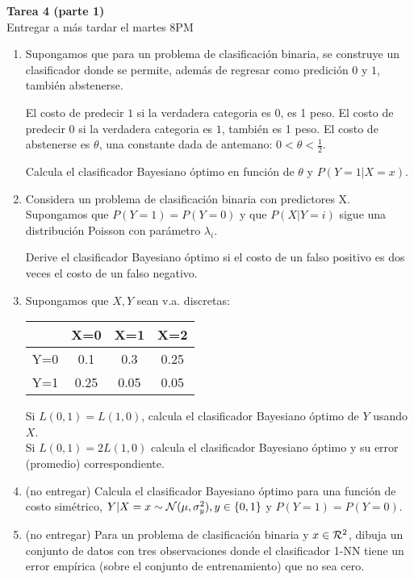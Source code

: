 \documentclass[12pt]{book}
\newcommand {\?}{?`}
\begin{document}
\specialaccent \mbox{} 
\begin{center}
{\Large \bf Tarea 4 (parte 1)} \mbox{} \vspace{0.5cm} \\
Entregar a m\'as tardar el martes 8PM
\end{center}


\begin{enumerate}
\item 
Supongamos que para un problema de clasificaci\'{o}n binaria, se construye un clasificador donde se permite, 
adem\'{a}s de regresar como predici\'{o}n $0$ y $1$,  tambi\'{e}n abstenerse.

El costo de predecir $1$ si la verdadera categoria es $0$, es 1 peso.   El costo de predecir $0$ si la verdadera categoria es $1$, tambi\'{e}n es 1 peso. El costo de abstenerse es $\theta$, una constante dada de antemano: $0 < \theta  < \frac{1}{2}$.

Calcula el clasificador Bayesiano \'{o}ptimo en funci\'{o}n de $\theta$ y $P(Y=1|X=x)$.   

\item
Considera un problema de clasificaci\'{o}n binaria con predictores X.  Supongamos
que $P(Y = 1) = P(Y = 0)$ y que $P(X|Y = i)$ sigue una distribuci\'{o}n
Poisson con par\'{a}metro $\lambda_i$.

Derive el clasificador Bayesiano  \'{o}ptimo si el costo de un falso positivo
es dos veces el costo de un falso negativo.


\item
Supongamos que $X,Y$ sean v.a. discretas:

\begin{tabular}{c|ccc}
 & X=0 & X=1 & X=2  \\ \hline
Y=0 & 0.1 & 0.3 & 0.25\\
Y=1  & 0.25 & 0.05 & 0.05\\
\end{tabular}

Si $L(0,1)=L(1,0)$, calcula el clasificador Bayesiano \'optimo de $Y$ usando $X$.\\
Si $L(0,1)=2L(1,0)$ calcula el clasificador Bayesiano \'optimo y su error (promedio) correspondiente. \\


\item (no entregar)
Calcula el clasificador Bayesiano \'optimo para una funci\'on de costo sim\'etrico, $Y|X=x \sim {\cal N}(\mu, \sigma^2_y), y\in \{0,1\}$ y $P(Y=1)=P(Y=0)$.


\item  (no entregar)
Para un problema de clasificaci\'on binaria y $x\in {\cal R}^2$, dibuja un conjunto de datos con tres observaciones donde el clasificador 1-NN tiene un error emp\'{i}rica (sobre el conjunto de entrenamiento) que no sea cero.


\end{enumerate}
\end{document}
